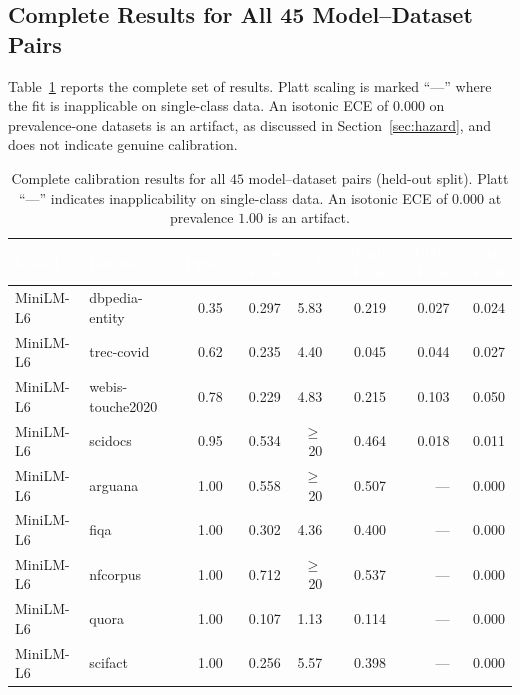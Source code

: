 \documentclass[sn-mathphys-num,pdflatex]{sn-jnl}
\newcommand{\thead}[1]{\textcolor{white}{\textbf{#1}}}
\begin{document}
\begin{appendices}

\section{Complete Results for All 45 Model--Dataset Pairs}\label{app:full}
Table~\ref{tab:full} reports the complete set of results. Platt scaling is marked
``---'' where the fit is inapplicable on single-class data. An isotonic ECE of
$0.000$ on prevalence-one datasets is an artifact, as discussed in
Section~\ref{sec:hazard}, and does not indicate genuine calibration.

\begin{table}[h!]
\centering
\caption{Complete calibration results for all $45$ model--dataset pairs (held-out
split). Platt ``---'' indicates inapplicability on single-class data. An isotonic
ECE of $0.000$ at prevalence $1.00$ is an artifact.}\label{tab:full}
\scriptsize
\setlength{\tabcolsep}{3pt}
\begin{tabular}{llrrrrrr}
\toprule
\rowcolor{headblue}
\thead{Model} & \thead{Dataset} & \thead{Prev.} & \thead{raw ECE} & \thead{$T$} & \thead{temp ECE} & \thead{Platt ECE} & \thead{iso ECE} \\
\midrule
\rowcolor{cleangreen}
MiniLM-L6      & dbpedia-entity   & 0.35 & 0.297 & 5.83 & 0.219 & 0.027 & 0.024 \\
\rowcolor{cleangreen}
MiniLM-L6      & trec-covid       & 0.62 & 0.235 & 4.40 & 0.045 & 0.044 & 0.027 \\
\rowcolor{cleangreen}
MiniLM-L6      & webis-touche2020 & 0.78 & 0.229 & 4.83 & 0.215 & 0.103 & 0.050 \\
\rowcolor{cleangreen}
MiniLM-L6      & scidocs          & 0.95 & 0.534 & $\geq$20 & 0.464 & 0.018 & 0.011 \\
\rowcolor{singleclasspink}
MiniLM-L6      & arguana          & 1.00 & 0.558 & $\geq$20 & 0.507 & --- & 0.000 \\
\rowcolor{singleclasspink}
MiniLM-L6      & fiqa             & 1.00 & 0.302 & 4.36 & 0.400 & --- & 0.000 \\
\rowcolor{singleclasspink}
MiniLM-L6      & nfcorpus         & 1.00 & 0.712 & $\geq$20 & 0.537 & --- & 0.000 \\
\rowcolor{singleclasspink}
MiniLM-L6      & quora            & 1.00 & 0.107 & 1.13 & 0.114 & --- & 0.000 \\
\rowcolor{singleclasspink}
MiniLM-L6      & scifact          & 1.00 & 0.256 & 5.57 & 0.398 & --- & 0.000 \\

\end{tabular}
\end{table}
\end{appendices}
\end{document}

